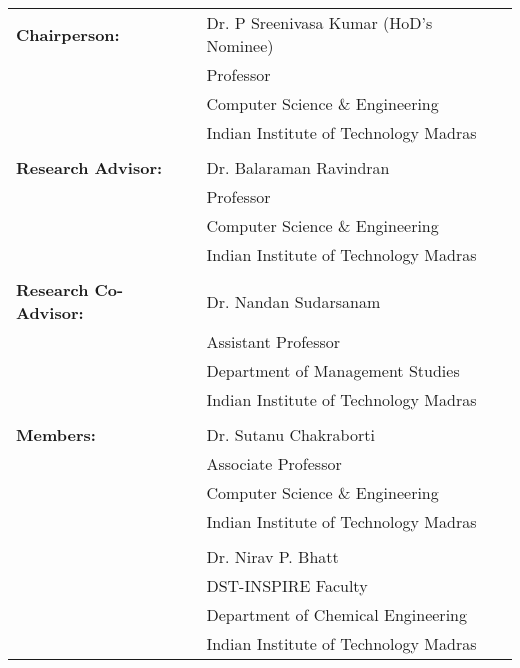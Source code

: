 \begin{committee}
\begin{small}
\begin{table}[htb]
\begin{tabular}{l l}
{\bf Chairperson:} & Dr. P Sreenivasa Kumar (HoD's Nominee)\\
	& Professor \\
	& Computer Science \& Engineering\\
	& Indian Institute of Technology Madras\\
	& \\
{\bf Research Advisor:} & Dr. Balaraman Ravindran\\
	& Professor \\
	& Computer Science \& Engineering\\
	& Indian Institute of Technology Madras\\
	& \\
{\bf Research Co-Advisor:} & Dr. Nandan Sudarsanam\\
	& Assistant Professor \\
	& Department of Management Studies\\
	& Indian Institute of Technology Madras\\
	& \\
{\bf Members:} & Dr. Sutanu Chakraborti\\
	& Associate Professor \\
	& Computer Science \& Engineering\\
	& Indian Institute of Technology Madras\\
	& \\
	& Dr. Nirav P. Bhatt\\
	& DST-INSPIRE Faculty\\
	& Department of Chemical Engineering\\
	& Indian Institute of Technology Madras\\
\end{tabular}
\end{table}
\end{small}
\end{committee}
